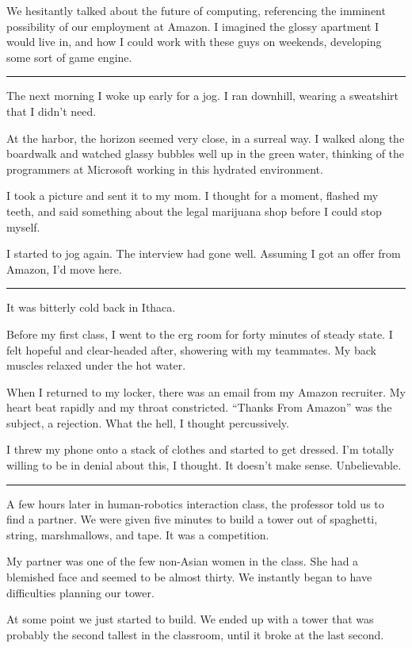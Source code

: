 We hesitantly talked about the future of computing, referencing the imminent
possibility of our employment at Amazon.  I imagined the glossy apartment I
would live in, and how I could work with these guys on weekends, developing some
sort of game engine.

\plainfancybreak{12pt}{2}{}

The next morning I woke up early for a jog.  I ran downhill, wearing a
sweatshirt that I didn't need.

At the harbor, the horizon seemed very close, in a surreal way.  I walked along
the boardwalk and watched glassy bubbles well up in the green water, thinking of
the programmers at Microsoft working in this hydrated environment.

I took a picture and sent it to my mom.  I thought for a moment, flashed my
teeth, and said something about the legal marijuana shop before I could stop
myself.

I started to jog again.  The interview had gone well.  Assuming I got an offer
from Amazon, I'd move here. 

\plainfancybreak{12pt}{2}{}

It was bitterly cold back in Ithaca.

Before my first class, I went to the erg room for forty minutes of steady state.
I felt hopeful and clear-headed after, showering with my teammates.  My back
muscles relaxed under the hot water.

When I returned to my locker, there was an email from my Amazon recruiter.  My
heart beat rapidly and my throat constricted.  ``Thanks From Amazon'' was the
subject, a rejection.  What the hell, I thought percussively. 

I threw my phone onto a stack of clothes and started to get dressed.  I'm
totally willing to be in denial about this, I thought.  It doesn't make sense.
Unbelievable. 

\plainfancybreak{12pt}{2}{}

A few hours later in human-robotics interaction class, the professor told us to find a
partner.  We were given five minutes to build a tower out of spaghetti, string,
marshmallows, and tape.  It was a competition.

My partner was one of the few non-Asian women in the class.  She had a blemished
face and seemed to be almost thirty.  We instantly began to have difficulties
planning our tower.

At some point we just started to build.  We ended up with a tower that was
probably the second tallest in the classroom, until it broke at the last second.

